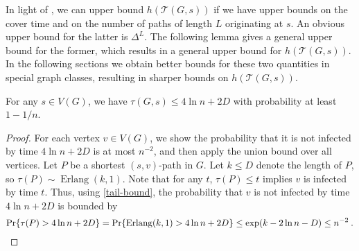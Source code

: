\documentclass{patmorin}
\DeclareMathOperator{\erlang}{Erlang}
\newcommand{\tcal}{\mathcal{T}}
\begin{document}
In light of , we can upper bound $h(\tcal(G,s))$ if we have upper bounds on the cover time and on the number of paths of length $L$ originating at $s$.
An obvious upper bound for the latter is $\Delta^L$.
The following lemma gives a general upper bound for the former,
which results in a general upper bound for $h(\tcal(G,s))$.
In the following sections we obtain better bounds 
for these two quantities in special graph classes,
resulting in sharper bounds on $h(\tcal(G,s))$.


\begin{lem}
For any $s\in V(G)$, we have
$\tau(G,s) \leq 4 \ln n + 2 D$ with probability at least
$1-1/n$.
\end{lem}

\begin{proof}
For each vertex $v\in V(G)$, we show the probability that it is not infected by time $4 \ln n + 2 D$ is at most $n^{-2}$, and then apply the union bound over all vertices.
Let $P$ be a shortest $(s,v)$-path in $G$.
Let $k\leq D$ denote the length of $P$, so $\tau(P)\sim \erlang(k,1)$.
Note that for any $t$,  $\tau(P)\leq t$ implies $v$ is infected by time $t$.
Thus, using \eqref{tail-bound}, the probability that $v$ is not infected by time $4 \ln n + 2 D$ is bounded by
\[
\Pr\{\tau(P) > 4 \ln n + 2 D\}
=
\Pr\{\erlang(k,1) > 4 \ln n + 2 D\}
\leq
\exp(k - 2\ln n - D) \leq n^{-2}\:.\qedhere
\]
\end{proof}


%
\end{document}
